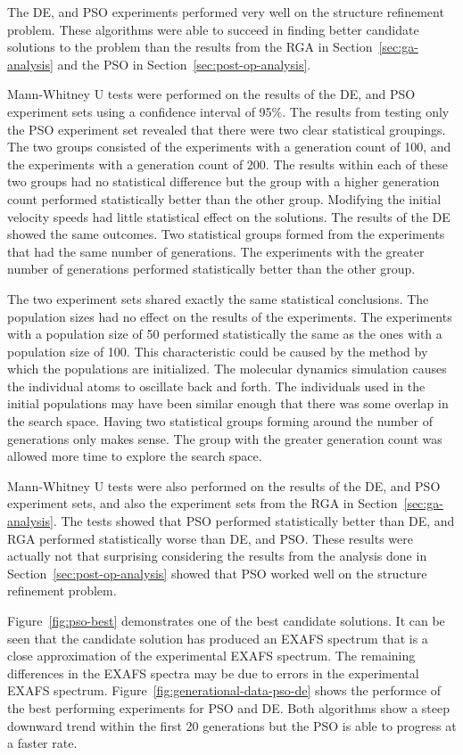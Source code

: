 The DE, and PSO experiments performed very well on the structure refinement problem. These algorithms were able to succeed in finding better candidate solutions to the problem than the results from the RGA in Section~\ref{sec:ga-analysis} and the PSO in Section~\ref{sec:post-op-analysis}.

Mann-Whitney U tests were performed on the results of the DE, and PSO experiment sets using a confidence interval of 95\%. The results from testing only the PSO experiment set revealed that there were two clear statistical groupings. The two groups consisted of the experiments with a generation count of 100, and the experiments with a generation count of 200. The results within each of these two groups had no statistical difference but the group with a higher generation count performed statistically better than the other group. Modifying the initial velocity speeds had little statistical effect on the solutions. The results of the DE showed the same outcomes. Two statistical groups formed from the experiments that had the same number of generations. The experiments with the greater number of generations performed statistically better than the other group.

The two experiment sets shared exactly the same statistical conclusions. The population sizes had no effect on the results of the experiments. The experiments with a population size of 50 performed statistically the same as the ones with a population size of 100. This characteristic could be caused by the method by which the populations are initialized. The molecular dynamics simulation causes the individual atoms to oscillate back and forth. The individuals used in the initial populations may have been similar enough that there was some overlap in the search space. Having two statistical groups forming around the number of generations only makes sense. The group with the greater generation count was allowed more time to explore the search space.

Mann-Whitney U tests were also performed on the results of the DE, and PSO experiment sets, and also the experiment sets from the RGA in Section~\ref{sec:ga-analysis}. The tests showed that PSO performed statistically better than DE, and RGA performed statistically worse than DE, and PSO. These results were actually not that surprising considering the results from the analysis done in Section~\ref{sec:post-op-analysis} showed that PSO worked well on the structure refinement problem.

Figure~\ref{fig:pso-best} demonstrates one of the best candidate solutions. It can be seen that the candidate solution has produced an EXAFS spectrum that is a close approximation of the experimental EXAFS spectrum. The remaining differences in the EXAFS spectra may be due to errors in the experimental EXAFS spectrum. Figure~\ref{fig:generational-data-pso-de} shows the performce of the best performing experiments for PSO and DE. Both algorithms show a steep downward trend within the first 20 generations but the PSO is able to progress at a faster rate.

